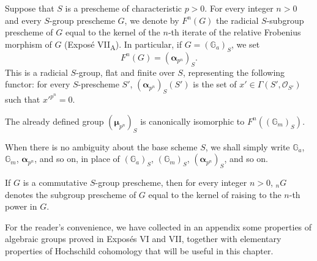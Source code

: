 Suppose that \(S\) is a prescheme of characteristic \(p>0\).  For every integer
\(n>0\) and every \(S\)-group prescheme \(G\), we denote by \(F^n(G)\) the
radicial \(S\)-subgroup prescheme of \(G\) equal to the kernel of the \(n\)-th
iterate of the relative Frobenius morphism of \(G\) (Exposé VII\textsubscript{A}).
In particular, if \(G=(\mathbb G_a)_S\), we set
\[
  F^n(G)=(\boldsymbol\alpha_{p^n})_S .
\]
This is a radicial \(S\)-group, flat and finite over \(S\), representing the
following functor: for every \(S\)-prescheme \(S'\),
\((\boldsymbol\alpha_{p^n})_S(S')\) is the set of
\(x'\in\Gamma(S',\mathcal O_{S'})\) such that \(x'^{p^n}=0\).

The already defined group \((\boldsymbol\mu_{p^n})_S\) is canonically isomorphic
to \(F^n((\mathbb G_m)_S)\).

When there is no ambiguity about the base scheme \(S\), we shall simply write
\(\mathbb G_a\), \(\mathbb G_m\), \(\boldsymbol\alpha_{p^n}\), and so on, in
place of \((\mathbb G_a)_S\), \((\mathbb G_m)_S\),
\((\boldsymbol\alpha_{p^n})_S\), and so on.

If \(G\) is a commutative \(S\)-group prescheme, then for every integer \(n>0\),
\({}_nG\) denotes the subgroup prescheme of \(G\) equal to the kernel of
raising to the \(n\)-th power in \(G\).

For the reader's convenience, we have collected in an appendix some properties
of algebraic groups proved in Exposés VI and VII, together with elementary
properties of Hochschild cohomology that will be useful in this chapter.






